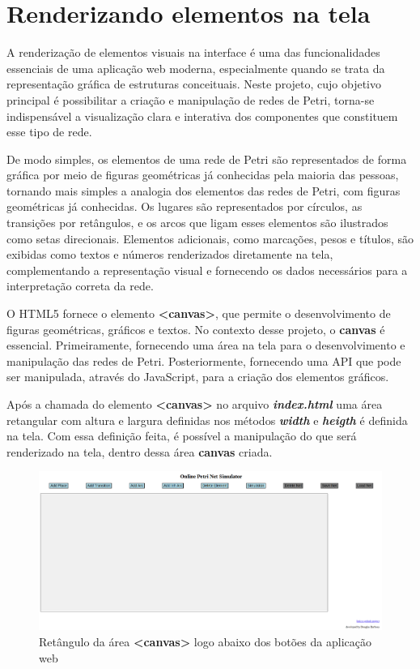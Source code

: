\documentclass[
	12pt,				%
	openright,			%
	oneside,			%
	a4paper,			%
	english,			%
	brazil				%
	]{abntex2}
\begin{document}
\section{Renderizando elementos na tela}

A renderização de elementos visuais na interface é uma das funcionalidades essenciais de uma aplicação web moderna, especialmente quando se trata da representação gráfica de estruturas conceituais. Neste projeto, cujo objetivo principal é possibilitar a criação e manipulação de redes de Petri, torna-se indispensável a visualização clara e interativa dos componentes que constituem esse tipo de rede.

De modo simples, os elementos de uma rede de Petri são representados de forma gráfica por meio de figuras geométricas já conhecidas pela maioria das pessoas, tornando mais simples a analogia dos elementos das redes de Petri, com figuras geométricas já conhecidas. Os lugares são representados por círculos, as transições por retângulos, e os arcos que ligam esses elementos são ilustrados como setas direcionais. Elementos adicionais, como marcações, pesos e títulos, são exibidas como textos e números renderizados diretamente na tela, complementando a representação visual e fornecendo os dados necessários para a interpretação correta da rede.

O HTML5 fornece o elemento \textbf{<canvas>}, que permite o desenvolvimento de figuras geométricas, gráficos e textos. No contexto desse projeto, o \textbf{canvas} é essencial. Primeiramente, fornecendo uma área na tela para o desenvolvimento e manipulação das redes de Petri. Posteriormente, fornecendo uma API que pode ser manipulada, através do JavaScript, para a criação dos elementos gráficos. 



Após a chamada do elemento \textbf{<canvas>} no arquivo \textbf{\textit{index.html}} uma área retangular com altura e largura definidas nos métodos \textbf{\textit{width}} e \textbf{\textit{heigth}} é definida na tela. Com essa definição feita, é possível a manipulação do que será renderizado na tela, dentro dessa área \textbf{canvas} criada. 

\begin{figure}[ht] 
	\centering
	\includegraphics[scale=0.3]{figuras/area_canvas.png}
	\caption[Área canvas]{Retângulo da área \textbf{<canvas>} logo abaixo dos botões da aplicação web}
	\label{fig:area_canvas}
\end{figure}
\FloatBarrier
\end{document}
